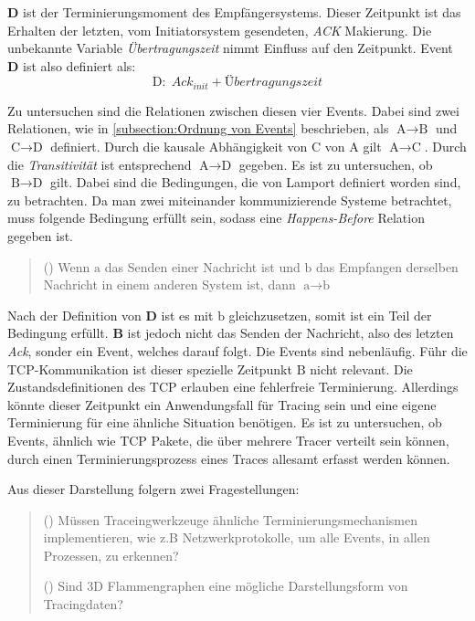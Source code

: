  \textbf{D} ist der Terminierungsmoment des Empfängersystems. Dieser Zeitpunkt ist das Erhalten der letzten, vom Initiatorsystem gesendeten, \emph{ACK} Makierung. Die unbekannte Variable \emph{Übertragungszeit} nimmt Einfluss auf den Zeitpunkt. Event \textbf{D} ist also definiert als:
 \[
 \text{D}: \; Ack_{init} + Übertragungszeit 
 \]
 
 Zu untersuchen sind die Relationen zwischen diesen vier Events.
 Dabei sind zwei Relationen, wie in \cref{subsection:Ordnung von Events} beschrieben, als $\text{A}\rightarrow\text{B}$ und $\text{C}\rightarrow\text{D}$ definiert. Durch die kausale Abhängigkeit von $\text{C}$ von $\text{A}$ gilt $\text{A}\rightarrow\text{C}$. Durch die \emph{Transitivität} ist entsprechend  $\text{A}\rightarrow\text{D}$ gegeben.  Es ist zu untersuchen, ob $\text{B}\rightarrow\text{D}$ gilt.
 Dabei sind die Bedingungen, die von Lamport definiert worden sind, zu betrachten. Da man zwei miteinander kommunizierende Systeme betrachtet, muss folgende Bedingung erfüllt sein, sodass eine \emph{Happens-Before} Relation gegeben ist. 
 \begin{quote}
 	() Wenn $\text{a}$ das Senden einer Nachricht ist und $\text{b}$ das Empfangen derselben Nachricht in einem anderen System ist, dann $\text{a}\rightarrow\text{b}$
 \end{quote}

Nach der Definition von \textbf{D} ist es mit $\text{b}$ gleichzusetzen, somit ist ein Teil der Bedingung erfüllt. \textbf{B} ist jedoch nicht das Senden der Nachricht, also des letzten \emph{Ack}, sonder ein Event, welches darauf folgt. Die Events sind nebenläufig. Führ die TCP-Kommunikation ist dieser spezielle Zeitpunkt $\text{B}$ nicht relevant. Die Zustandsdefinitionen des TCP erlauben eine fehlerfreie Terminierung. Allerdings könnte dieser Zeitpunkt ein Anwendungsfall für Tracing sein und eine eigene Terminierung für eine ähnliche Situation benötigen. Es ist zu untersuchen, ob Events, ähnlich wie TCP Pakete, die über mehrere Tracer verteilt sein können, durch einen Terminierungsprozess eines Traces allesamt erfasst werden können.

Aus dieser Darstellung folgern zwei Fragestellungen:
\begin{quote}
	() Müssen Traceingwerkzeuge ähnliche Terminierungsmechanismen implementieren, wie z.B Netzwerkprotokolle, um alle Events, in allen Prozessen, zu erkennen?
	
	() Sind 3D Flammengraphen eine mögliche Darstellungsform von Tracingdaten?
\end{quote}



